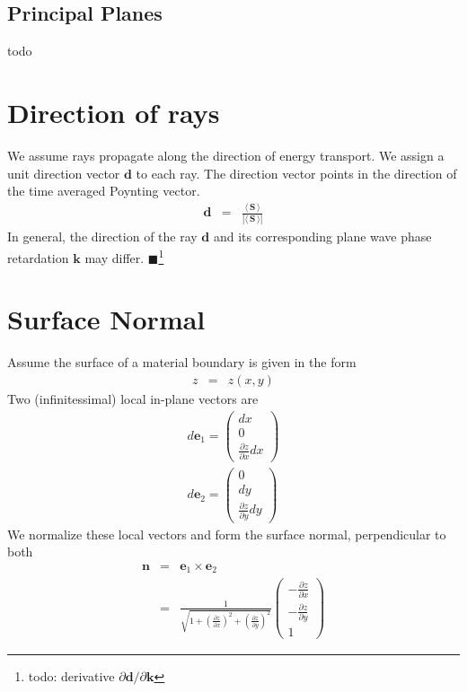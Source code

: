 \documentclass[12pt,a4paper,twoside,openright,BCOR10mm,headsepline,titlepage,abstracton,chapterprefix,final]{scrreprt}
\newcommand\Vector[1]{{\mathbf{#1}}}
\newcommand\wavenumber{k}
\newcommand\Wavevector{\Vector{\wavenumber}}
\newcommand{\timeavg}[1]{{\langle\,#1\,\rangle}}
\newcommand{\remark}[1]{{\color{red}$\blacksquare$}\footnote{{\color{red}#1}}}
\begin{document}
\subsection{Principal Planes}
todo


\section{Direction of rays} \label{sec:raydir}
We assume rays propagate along the direction of energy transport.
We assign a unit direction vector $\Vector{d}$ to each ray.
The direction vector points in the direction of the time averaged Poynting vector.
\begin{eqnarray}
 \Vector{d} &=& \frac{\timeavg{\Vector{S}}}{|\timeavg{\Vector{S}}|}
\end{eqnarray}
In general, the direction of the ray $\Vector{d}$ and its corresponding plane wave phase retardation $\Vector{k}$ may differ.
\remark{todo: derivative $\partial \Vector{d} /\partial \Wavevector$}

\section{Surface Normal}
Assume the surface of a material boundary is given in the form
\begin{eqnarray}
 z &=& z(x,y)
\end{eqnarray}
Two (infinitessimal) local in-plane vectors are 
\begin{eqnarray}
d\Vector{e}_1 = \begin{pmatrix}
                 dx \\ 0 \\ \frac{\partial z}{\partial x} dx
                \end{pmatrix}
\\
d\Vector{e}_2 = \begin{pmatrix}
                 0 \\ dy \\ \frac{\partial z}{\partial y} dy
                \end{pmatrix}
\end{eqnarray}
We normalize these local vectors and form the surface normal, perpendicular to both
\begin{eqnarray}
 \Vector{n} &=& \Vector{e}_1 \times \Vector{e}_2 \\
 &=& 
   \frac{1}{\sqrt{ 1 + \left( \frac{\partial z}{\partial x} \right)^2 + \left( \frac{\partial z}{\partial y} \right)^2 }}
   \begin{pmatrix}
    - \frac{\partial z}{\partial x} \\ - \frac{\partial z}{\partial y} \\ 1
   \end{pmatrix}
\end{eqnarray}
\end{document}
